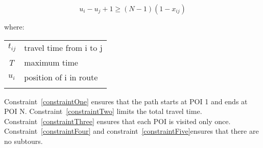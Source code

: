 \begin{equation} 
    \label{constraintFive}
    u_i - u_j + 1 \geq (N-1)(1-x_{ij})
\end{equation}

where:

\begin{tabular}{l l}
\textit{$t_{ij}$} & travel time from i to j \\
\textit{T} & maximum time \\
\textit{$u_i$} & position of i in route\\

               & \\

\end{tabular}


Constraint~\ref{constraintOne} ensures that the path starts at POI 1 and ends at POI N.
Constraint~\ref{constraintTwo} limits the total travel time.
Constraint~\ref{constraintThree} ensures that each POI is visited only once.
Constraint~\ref{constraintFour} and constraint~\ref{constraintFive}ensures that there are no subtours.
\\
